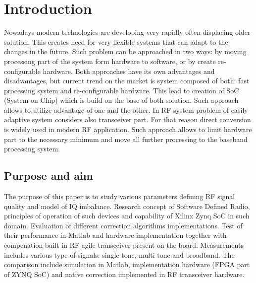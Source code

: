 \documentclass[en,printmode]{mgr}
\begin{document}
\chapter{Introduction}
	Nowadays modern technologies are developing very rapidly often displacing older solution. This creates need
	for very flexible systems that can adapt to the changes in the future. Such problem can be approached in
	two ways: by moving processing part of the system form hardware to software, or by create re-configurable
	hardware. Both approaches have its own advantages and disadvantages, but current trend on the market is
	system composed of both: fast processing system and re-configurable hardware. This lead to creation of SoC
	(System on Chip) which is build on the base of both solution. Such approach allows to utilize advantage of
	one and the other. In RF system problem of easily adaptive system considers also transceiver part. For that
	reason direct conversion is widely used in modern RF application. Such approach allows to limit hardware part
	to the necessary minimum and move all further processing to the baseband processing system. 
	
	\section{Purpose and aim}
			The purpose of this paper is to study various parameters defining RF signal quality and model of IQ
		imbalance. Research concept of Software Defined Radio, principles of operation of such devices and capability
		of Xilinx Zynq SoC in such domain. Evaluation of different correction algorithms implementations. Test
		of their performance in Matlab and hardware implementation together with compenation built in RF agile
		transceiver present on the board. Measurements includes various type of signals: single tone, multi tone 
		and broadband.
		The comparison include simulation in Matlab, implementation hardware (FPGA part of ZYNQ SoC) and
		native correction implemented in RF transceiver hardware.
		
\end{document}
